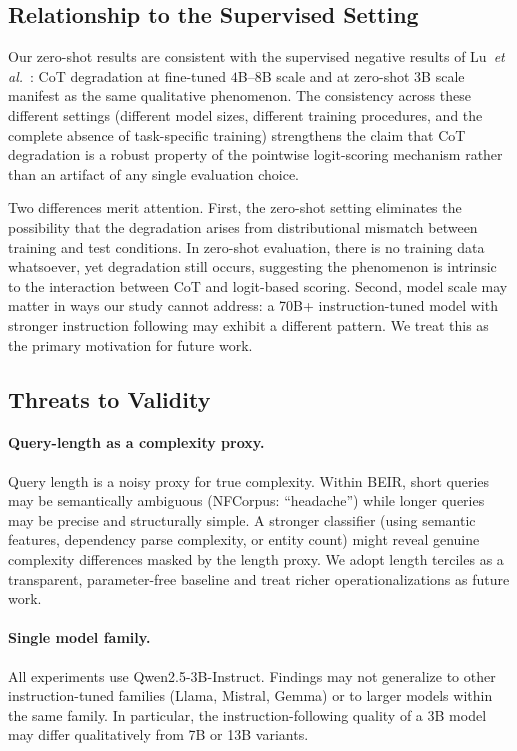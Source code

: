 \documentclass[12pt]{article}
\newcommand{\CoT}{CoT}
\newcommand{\etal}{\textit{et al.}}
\begin{document}
\subsection{Relationship to the Supervised Setting}
\label{sec:supervised_comparison}

Our zero-shot results are consistent with the supervised negative results of
Lu~\etal~\citep{lu2025rethinking}: \CoT{} degradation at fine-tuned $4$B--$8$B
scale and at zero-shot $3$B scale manifest as the same qualitative phenomenon.
The consistency across these different settings (different model sizes, different
training procedures, and the complete absence of task-specific training) strengthens
the claim that \CoT{} degradation is a robust property of the pointwise
logit-scoring mechanism rather than an artifact of any single evaluation choice.

Two differences merit attention.  First, the zero-shot setting eliminates the
possibility that the degradation arises from distributional mismatch between
training and test conditions.  In zero-shot evaluation, there is no training
data whatsoever, yet degradation still occurs, suggesting the phenomenon is
intrinsic to the interaction between \CoT{} and logit-based scoring.  Second,
model scale may matter in ways our study cannot address: a 70B+ instruction-tuned
model with stronger instruction following may exhibit a different pattern.  We
treat this as the primary motivation for future work.

\subsection{Threats to Validity}
\label{sec:threats}

\paragraph{Query-length as a complexity proxy.}
Query length is a noisy proxy for true complexity.  Within BEIR, short queries
may be semantically ambiguous (NFCorpus: ``headache'') while longer queries may
be precise and structurally simple.  A stronger classifier (using semantic
features, dependency parse complexity, or entity count) might reveal genuine
complexity differences masked by the length proxy.  We adopt length terciles as
a transparent, parameter-free baseline and treat richer operationalizations as
future work.

\paragraph{Single model family.}
All experiments use Qwen2.5-3B-Instruct.  Findings may not generalize to other
instruction-tuned families (Llama, Mistral, Gemma) or to larger models within
the same family.  In particular, the instruction-following quality of a 3B model
may differ qualitatively from 7B or 13B variants.
\end{document}
